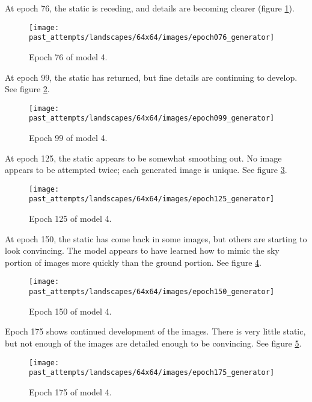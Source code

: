 \documentclass[11pt,letterpaper]{article}
\begin{document}
				At epoch 76, the static is receding, and details are becoming clearer (figure \ref{fig:wa64:epoch076generator}).
				\begin{figure}
					\centering
					\texttt{[image: past\_attempts/landscapes/64x64/images/epoch076\_generator]}
					\caption{Epoch 76 of model 4.}
					\label{fig:wa64:epoch076generator}
				\end{figure}

				At epoch 99, the static has returned, but fine details are continuing to develop.
				See figure \ref{fig:wa64:epoch099generator}.
				\begin{figure}
					\centering
					\texttt{[image: past\_attempts/landscapes/64x64/images/epoch099\_generator]}
					\caption{Epoch 99 of model 4.}
					\label{fig:wa64:epoch099generator}
				\end{figure}

				At epoch 125, the static appears to be somewhat smoothing out.
				No image appears to be attempted twice; each generated image is unique.
				See figure \ref{fig:wa64:epoch125generator}.
				\begin{figure}
					\centering
					\texttt{[image: past\_attempts/landscapes/64x64/images/epoch125\_generator]}
					\caption{Epoch 125 of model 4.}
					\label{fig:wa64:epoch125generator}
				\end{figure}

				At epoch 150, the static has come back in some images, but others are starting to look convincing.
				The model appears to have learned how to mimic the sky portion of images more quickly than the ground portion.
				See figure \ref{fig:wa64:epoch150generator}.
				\begin{figure}
					\centering
					\texttt{[image: past\_attempts/landscapes/64x64/images/epoch150\_generator]}
					\caption{Epoch 150 of model 4.}
					\label{fig:wa64:epoch150generator}
				\end{figure}

				Epoch 175 shows continued development of the images.
				There is very little static, but not enough of the images are detailed enough to be convincing.
				See figure \ref{fig:wa64:epoch175generator}.
				\begin{figure}
					\centering
					\texttt{[image: past\_attempts/landscapes/64x64/images/epoch175\_generator]}
					\caption{Epoch 175 of model 4.}
					\label{fig:wa64:epoch175generator}
				\end{figure}
\end{document}
